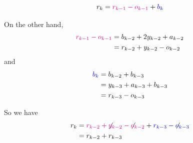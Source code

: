 \begin{annotation}
\begin{goals}
$$
r_k 
	= {\color{magenta}r_{k-1}-o_{k-1}}+{\color{blue}b_k}
$$

On the other hand, 
\begin{align*}
\color{magenta}
r_{k-1}-o_{k-1}
  & = b_{k-2} + 2 y_{k-2} + a_{k-2}  \\
  & = r_{k-2} + y_{k-2} - o_{k-2}
\end{align*}
and
\begin{align*}
\color{blue}
b_k 
  & = b_{k-2}+b_{k-3} \\
  & = y_{k-3} + a_{k-3} + b_{k-3} \\
  & = r_{k-3} - o_{k-3}	
\end{align*}


So we have
\begin{align*}
r_k & = {\color{magenta}r_{k-2} + {\color{black}\not} y_{k-2} - {\color{black}\not} o_{k-2}} + {\color{blue}r_{k-3} - {\color{black}\not}o_{k-3}} \\
& = r_{k-2} + r_{k-3}
\end{align*}

\end{goals}
\end{annotation}	

	
	

\standardonlynewpage

%
%
%
%
%
%
%	
%	
%
%
%
%
%	
%
%
%
%
%
%
%
%
%

